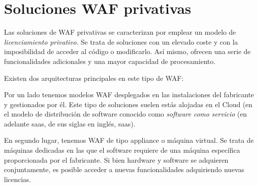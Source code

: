 \section{Soluciones WAF privativas}
\par Las soluciones de WAF privativas se caracterizan por emplear un modelo de {\em licenciamiento privativo\cite{privativo}}. Se trata de
soluciones con un elevado coste y con la imposibilidad de acceder al código o modificarlo. Así mismo, ofrecen una serie de funcionalidades
adicionales y una mayor capacidad de procesamiento.
\par Existen dos arquitecturas principales en este tipo de WAF:
\par Por un lado tenemos modelos WAF desplegados en las instalaciones del fabricante y gestionados por él. Este tipo de soluciones suelen estás
alojadas en el Cloud (en el modelo de distribución de software conocido como {\em software como servicio} (en adelante \acrshort{saas}, de sus
siglas en inglés, \acrlong{saas}).
\par En segundo lugar, tenemos WAF de tipo appliance o máquina virtual. Se trata de máquinas dedicadas en las que el software requiere de una
máquina específica proporcionada por el fabricante. Si bien hardware y software se adquieren conjuntamente, es posible acceder a nuevas
funcionalidades adquiriendo nuevas licencias.

